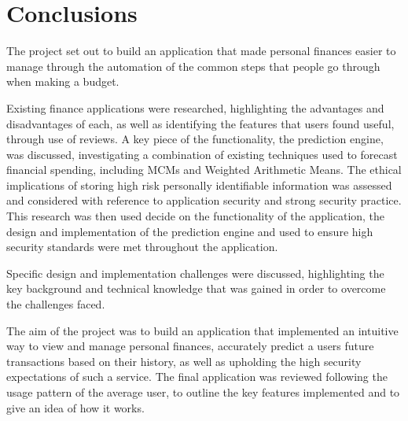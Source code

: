 \chapter{Conclusions}
\label{cha:conclusions}

\begin{comment}
Chapter 7: Conclusions
This can be a short chapter summarizing what you have achieved and what you have learned from the achievement. It is different from the abstract. The main results of your work should be highlighted with a critical appraisal of them indicating the extent to which the objectives outlined in Chapter 1 have been met. Exaggerated claims are counterproductive here. Recommendations for further activity are often included in this chapter.
\end{comment}

The project set out to build an application that made personal finances easier to manage through the automation of the common steps that people go through when making a budget.

Existing finance applications were researched, highlighting the advantages and disadvantages of each, as well as identifying the features that users found useful, through use of reviews.
%
A key piece of the functionality, the prediction engine, was discussed, investigating a combination of existing techniques used to forecast financial spending, including MCMs and Weighted Arithmetic Means. 
%
The ethical implications of storing high risk personally identifiable information was assessed and considered with reference to application security and strong security practice.
%
This research was then used decide on the functionality of the application, the design and implementation of the prediction engine and used to ensure high security standards were met throughout the application.

Specific design and implementation challenges were discussed, highlighting the key background and technical knowledge that was gained in order to overcome the challenges faced. 

The aim of the project was to build an application that implemented an intuitive way to view and manage personal finances, accurately predict a users future \glspl{transaction} based on their history, as well as upholding the high security expectations of such a service.
%
The final application was reviewed following the usage pattern of the average user, to outline the key features implemented and to give an idea of how it works.


